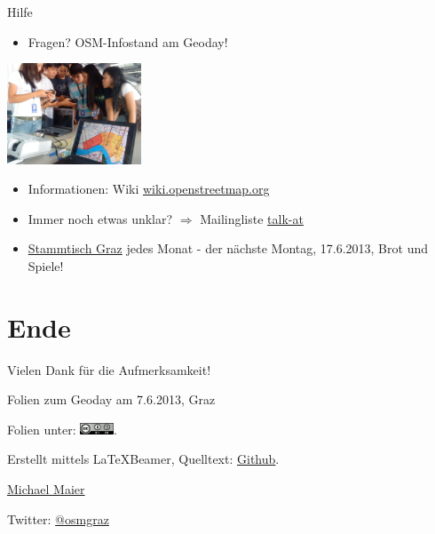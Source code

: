 \documentclass{beamer}
\begin{document}
\begin{frame}{Hilfe}

\begin{itemize}
  \item Fragen? OSM-Infostand am Geoday!
\end{itemize}
 \begin{center}
	  \includegraphics[width=4cm]{osm_workshop.jpg}
 \end{center}
\begin{itemize}
  \item Informationen: Wiki \href{http://wiki.openstreetmap.org}{wiki.openstreetmap.org}
  \item Immer noch etwas unklar? $\Rightarrow$ Mailingliste \href{http://lists.openstreetmap.org/listinfo/talk-at}{talk-at}
  \pause
  \item \href{http://wiki.openstreetmap.org/wiki/Graz/Stammtisch}{Stammtisch Graz} jedes Monat - der nächste Montag, 17.6.2013, Brot und Spiele!
\end{itemize}

\end{frame}

\section{Ende}

\begin{frame}{Vielen Dank für die Aufmerksamkeit!}

  Folien zum Geoday am 7.6.2013, Graz
\vspace{1cm}

Folien unter: \includegraphics[width=1cm]{cc-by-sa.png}.
\vspace{1cm}

Erstellt mittels \LaTeX Beamer, Quelltext: \href{https://github.com/species/vortrag-osm-geoday}{Github}.
\vspace{1cm}

\href{mailto:michael.maier@student.tugraz.at}{Michael Maier}

Twitter: \href{https://twitter.com/osmgraz}{@osmgraz}
\end{frame}
\end{document}
